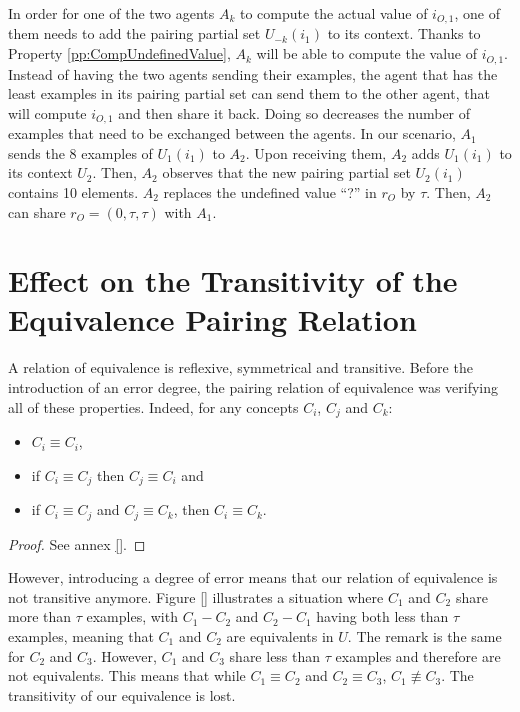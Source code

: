 In order for one of the two agents $A_{k}$ to compute the actual value of $i_{O,1}$, one of them needs to add the pairing partial set $U_{-k}(i_{1})$ to its context. Thanks to Property \ref{pp:CompUndefinedValue}, $A_{k}$ will be able to compute the value of $i_{O,1}$. Instead of having the two agents sending their examples, the agent that has the least examples in its pairing partial set can send them to the other agent, that will compute $i_{O,1}$ and then share it back. Doing so decreases the number of examples that need to be exchanged between the agents. In our scenario, $A_{1}$ sends the 8 examples of $U_{1}(i_{1})$ to $A_{2}$. Upon receiving them, $A_{2}$ adds $U_{1}(i_{1})$ to its context $U_{2}$. Then, $A_{2}$ observes that the new pairing partial set $U_{2}(i_{1})$ contains 10 elements. $A_{2}$ replaces the undefined value ``?'' in $r_{O}$ by $\tau$. Then, $A_{2}$ can share $r_{O} = (0, \tau, \tau)$ with $A_{1}$.


\section{Effect on the Transitivity of the Equivalence Pairing Relation}
\label{sec:TransitivityLoss}

A relation of equivalence is reflexive, symmetrical and transitive. Before the introduction of an error degree, the pairing relation of equivalence was verifying all of these properties. Indeed, for any concepts $C_{i}$, $C_{j}$ and $C_{k}$:

\begin{itemize}
    \item $C_{i} \equiv C_{i}$,
    \item if $C_{i} \equiv C_{j}$ then $C_{j} \equiv C_{i}$ and
    \item if $C_{i} \equiv C_{j}$ and $C_{j} \equiv C_{k}$, then $C_{i} \equiv C_{k}$.
\end{itemize}

\begin{proof}
See annex \ref{}.
\end{proof}

However, introducing a degree of error means that our relation of equivalence is not transitive anymore. Figure \ref{} illustrates a situation where $C_{1}$ and $C_{2}$ share more than $\tau$ examples, with $C_{1} - C_{2}$ and $C_{2} - C_{1}$ having both less than $\tau$ examples, meaning that $C_{1}$ and $C_{2}$ are equivalents in $U$. The remark is the same for $C_{2}$ and $C_{3}$. However, $C_{1}$ and $C_{3}$ share less than $\tau$ examples and therefore are not equivalents. This means that while $C_{1} \equiv C_{2}$ and $C_{2} \equiv C_{3}$, $C_{1} \not \equiv C_{3}$. The transitivity of our equivalence is lost.

